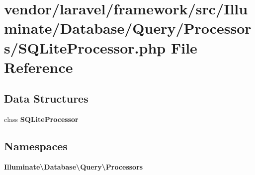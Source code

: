 \section{vendor/laravel/framework/src/\+Illuminate/\+Database/\+Query/\+Processors/\+S\+Q\+Lite\+Processor.php File Reference}
\label{_s_q_lite_processor_8php}
\subsection*{Data Structures}
\begin{DoxyCompactItemize}
\item 
class {\bf S\+Q\+Lite\+Processor}
\end{DoxyCompactItemize}
\subsection*{Namespaces}
\begin{DoxyCompactItemize}
\item 
 {\bf Illuminate\textbackslash{}\+Database\textbackslash{}\+Query\textbackslash{}\+Processors}
\end{DoxyCompactItemize}
